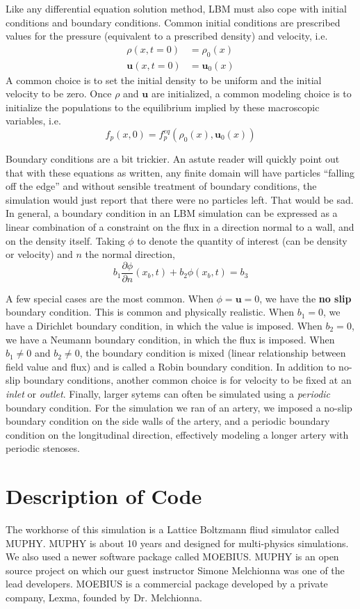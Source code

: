 \documentclass[11pt]{article} %
\renewcommand{\vec}[1]{\mathbf{#1}}
\begin{document}
Like any differential equation solution method, LBM must also cope with initial conditions and boundary conditions.
Common initial conditions are prescribed values for the pressure (equivalent to a prescribed density)
and velocity, i.e.
\begin{align*}
\rho(x, t=0) &= \rho_0(x) \\
\vec{u}(x, t=0) &= \vec{u}_0(x)
\end{align*}
A common choice is to set the initial density to be uniform and the initial velocity to be zero.
Once $\rho$ and $\vec{u}$ are initialized, a common modeling choice is to initialize the
populations to the equilibrium implied by these macroscopic variables, i.e.
$$f_p(x, 0) = f_p^{eq}(\rho_0(x), \vec{u}_0(x))$$

Boundary conditions are a bit trickier.  
An astute reader will quickly point out that with these equations as written,
any finite domain will have particles ``falling off the edge'' and without
sensible treatment of boundary conditions, the simulation would just report
that there were no particles left.  That would be sad.
In general, a boundary condition in an LBM simulation can be expressed as 
a linear combination of a constraint on the flux in a direction normal to a wall,
and on the density itself.  
Taking $\phi$ to denote the quantity of interest (can be density or velocity) 
and $n$ the normal direction,
$$b_1 \frac{\partial \phi}{\partial n}(x_b, t) + b_2 \phi(x_b, t) = b_3$$ 

A few special cases are the most common.  
When $\phi = \vec{u} = 0$, we have the \textbf{no slip} boundary condition.
This is common and physically realistic.
When $b_1 = 0$, we have a Dirichlet boundary condition, in which the value is imposed.
When $b_2 = 0$, we have a Neumann boundary condition, in which the flux is imposed.
When $b_1 \ne 0$ and $b_2 \ne 0$, the boundary condition is mixed 
(linear relationship between field value and flux) and is called a Robin boundary condition.
In addition to no-slip boundary conditions, another common choice is for velocity
to be fixed at an \textit{inlet} or \textit{outlet}.
Finally, larger sytems can often be simulated using a \textit{periodic} boundary condition.
For the simulation we ran of an artery, we imposed a no-slip boundary condition on the
side walls of the artery, and a periodic boundary condition on the longitudinal direction,
effectively modeling a longer artery with periodic stenoses.

\newpage
\section{Description of Code}
The workhorse of this simulation is a Lattice Boltzmann fliud simulator called MUPHY.
MUPHY is about 10 years and designed for multi-physics simulations.
We also used a newer software package called MOEBIUS.
MUPHY is an open source project on which our guest instructor Simone Melchionna
was one of the lead developers.
MOEBIUS is a commercial package developed by a private company,
Lexma, founded by Dr. Melchionna.
\end{document}
